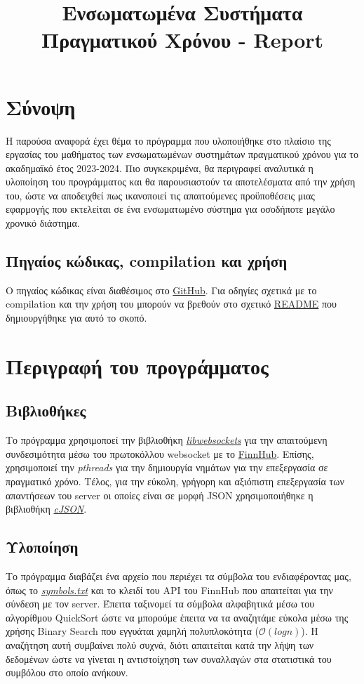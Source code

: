 \documentclass[11pt]{article}
\date{}
\title{Ενσωματωμένα Συστήματα Πραγματικού Χρόνου - Report}
\begin{document}
\maketitle
\section{Σύνοψη}
\label{sec:org5430921}
Η παρούσα αναφορά έχει θέμα το πρόγραμμα που υλοποιήθηκε στο πλαίσιο της εργασίας του μαθήματος των ενσωματωμένων συστημάτων πραγματικού χρόνου για το ακαδημαϊκό έτος 2023-2024. Πιο συγκεκριμένα, θα περιγραφεί αναλυτικά η υλοποίηση του προγράμματος και θα παρουσιαστούν τα αποτελέσματα από την χρήση του, ώστε να αποδειχθεί πως ικανοποιεί τις απαιτούμενες προϋποθέσεις μιας εφαρμογής που εκτελείται σε ένα ενσωματωμένο σύστημα για οσοδήποτε μεγάλο χρονικό διάστημα.
\subsection{Πηγαίος κώδικας, compilation και χρήση}
\label{sec:org4f09027}
Ο πηγαίος κώδικας είναι διαθέσιμος στο \href{https://github.com/thetonk/tradestats}{GitHub}. Για οδηγίες σχετικά με το compilation και την χρήση του μπορούν να βρεθούν στο σχετικό \href{https://github.com/thetonk/tradestats/blob/main/README.md}{README} που δημιουργήθηκε για αυτό το σκοπό.
\section{Περιγραφή του προγράμματος}
\label{sec:org1903ee0}
\subsection{Βιβλιοθήκες}
\label{sec:org4ae32be}
Το πρόγραμμα χρησιμοποεί την βιβλιοθήκη \href{https://libwebsockets.org/}{\emph{libwebsockets}} για την απαιτούμενη συνδεσιμότητα μέσω του πρωτοκόλλου websocket με το \href{https://finnhub.io}{FinnHub}. Επίσης, χρησιμοποιεί την \emph{pthreads} για την δημιουργία νημάτων για την επεξεργασία σε πραγματικό χρόνο. Τέλος, για την εύκολη, γρήγορη και αξιόπιστη επεξεργασία των απαντήσεων του server οι οποίες είναι σε μορφή JSON\autocite{sites:finnhub-api} χρησιμοποιήθηκε η βιβλιοθήκη \href{https://github.com/DaveGamble/cJSON}{\emph{cJSON}}.
\subsection{Υλοποίηση}
\label{sec:orgc4e0b40}
Το πρόγραμμα διαβάζει ένα αρχείο που περιέχει τα σύμβολα του ενδιαφέροντας μας, όπως το \emph{\href{https://github.com/thetonk/tradestats/blob/main/symbols.txt}{symbols.txt}} και το κλειδί του API του FinnHub που απαιτείται για την σύνδεση με τον server. Έπειτα ταξινομεί τα σύμβολα αλφαβητικά μέσω του αλγορίθμου QuickSort\autocite{enwiki:1241885213} ώστε να μπορούμε έπειτα να τα αναζητάμε εύκολα μέσω της χρήσης Binary Search που εγγυάται χαμηλή πολυπλοκότητα (\(\mathcal{O}(logn)\))\autocite{enwiki:1242941867}. Η αναζήτηση αυτή συμβαίνει πολύ συχνά, διότι απαιτείται κατά την λήψη των δεδομένων ώστε να γίνεται η αντιστοίχηση των συναλλαγών στα στατιστικά του συμβόλου στο οποίο ανήκουν.\\
\end{document}
